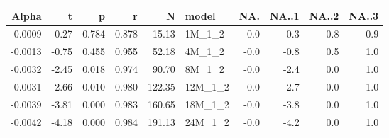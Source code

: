 \begin{table}[ht]
\centering
\begin{tabular}{rrrrrlrrrr}
  \hline
Alpha & t & p & r & N & model & NA. & NA..1 & NA..2 & NA..3 \\ 
  \hline
-0.0009 & -0.27 & 0.784 & 0.878 & 15.13 & 1M\_1\_2 & -0.0 & -0.3 & 0.8 & 0.9 \\ 
  -0.0013 & -0.75 & 0.455 & 0.955 & 52.18 & 4M\_1\_2 & -0.0 & -0.8 & 0.5 & 1.0 \\ 
  -0.0032 & -2.45 & 0.018 & 0.974 & 90.70 & 8M\_1\_2 & -0.0 & -2.4 & 0.0 & 1.0 \\ 
  -0.0031 & -2.66 & 0.010 & 0.980 & 122.35 & 12M\_1\_2 & -0.0 & -2.7 & 0.0 & 1.0 \\ 
  -0.0039 & -3.81 & 0.000 & 0.983 & 160.65 & 18M\_1\_2 & -0.0 & -3.8 & 0.0 & 1.0 \\ 
  -0.0042 & -4.18 & 0.000 & 0.984 & 191.13 & 24M\_1\_2 & -0.0 & -4.2 & 0.0 & 1.0 \\ 
   \hline
\end{tabular}
\end{table}

